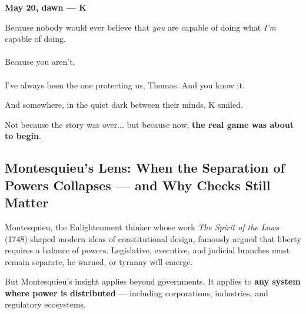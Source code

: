 \begin{JournalChat}
\vspace{1em}

\textbf{May 20, dawn — K}

\begin{adjustwidth}{2em}{}
    Because nobody would ever believe  
    that \textit{you} are capable of doing  
    what \textit{I’m} capable of doing.
    \\\\
    Because you aren’t.
    \\\\
    I’ve always been the one protecting us, Thomas.
    And you know it.
\end{adjustwidth}

\end{JournalChat}

\medskip

    And somewhere, in the quiet dark between their minds,  
    K smiled.
    
    Not because the story was over... but because now,  
    \textbf{the real game was about to begin}.



\subsection{Montesquieu's Lens: When the Separation of Powers Collapses — and Why Checks Still Matter}

Montesquieu, the Enlightenment thinker whose work \textit{The Spirit of the Laws} (1748) shaped modern ideas of constitutional design, famously argued that liberty requires a balance of powers. Legislative, executive, and judicial branches must remain separate, he warned, or tyranny will emerge.

\medskip

But Montesquieu's insight applies beyond governments. It applies to \textbf{any system where power is distributed} — including corporations, industries, and regulatory ecosystems.

